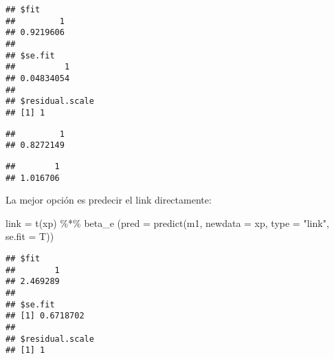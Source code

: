 \documentclass[
]{article}
\newenvironment{Shaded}{\begin{snugshade}}{\end{snugshade}}
\newcommand{\AttributeTok}[1]{\textcolor[rgb]{0.77,0.63,0.00}{#1}}
\newcommand{\DecValTok}[1]{\textcolor[rgb]{0.00,0.00,0.81}{#1}}
\newcommand{\FunctionTok}[1]{\textcolor[rgb]{0.00,0.00,0.00}{#1}}
\newcommand{\NormalTok}[1]{#1}
\newcommand{\OtherTok}[1]{\textcolor[rgb]{0.56,0.35,0.01}{#1}}
\newcommand{\SpecialCharTok}[1]{\textcolor[rgb]{0.00,0.00,0.00}{#1}}
\newcommand{\StringTok}[1]{\textcolor[rgb]{0.31,0.60,0.02}{#1}}
\begin{document}
\begin{verbatim}
## $fit
##         1 
## 0.9219606 
## 
## $se.fit
##          1 
## 0.04834054 
## 
## $residual.scale
## [1] 1
\end{verbatim}

\begin{Shaded}
\end{Shaded}

\begin{verbatim}
##         1 
## 0.8272149
\end{verbatim}

\begin{Shaded}
\end{Shaded}

\begin{verbatim}
##        1 
## 1.016706
\end{verbatim}

La mejor opción es predecir el link directamente:

\begin{Shaded}
\begin{Highlighting}[]
\NormalTok{link }\OtherTok{=} \FunctionTok{t}\NormalTok{(xp) }\SpecialCharTok{\%*\%}\NormalTok{ beta\_e}
\NormalTok{(}\AttributeTok{pred =} \FunctionTok{predict}\NormalTok{(m1, }\AttributeTok{newdata =}\NormalTok{ xp, }\AttributeTok{type =} \StringTok{"link"}\NormalTok{, }\AttributeTok{se.fit =}\NormalTok{ T))}
\end{Highlighting}
\end{Shaded}

\begin{verbatim}
## $fit
##        1 
## 2.469289 
## 
## $se.fit
## [1] 0.6718702
## 
## $residual.scale
## [1] 1
\end{verbatim}
\end{document}
